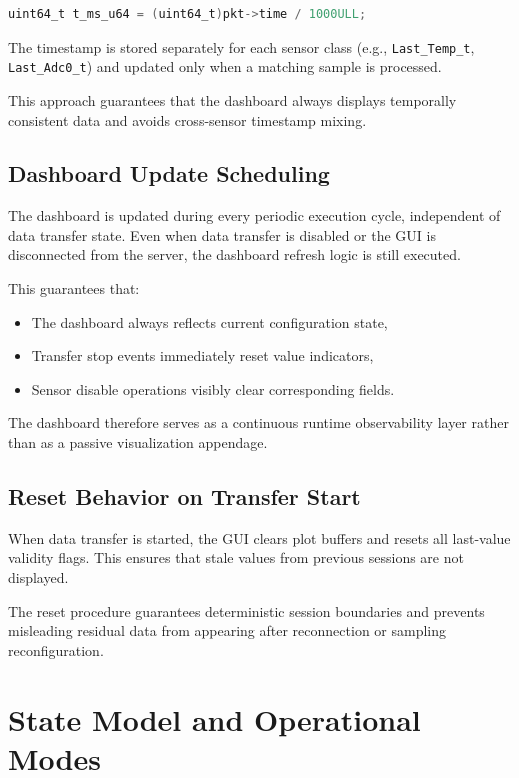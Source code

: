 \begin{lstlisting}[language=C]
	uint64_t t_ms_u64 = (uint64_t)pkt->time / 1000ULL;
\end{lstlisting}

The timestamp is stored separately for each sensor class (e.g., \texttt{Last\_Temp\_t}, \texttt{Last\_Adc0\_t}) and updated only when a matching sample is processed.

This approach guarantees that the dashboard always displays temporally consistent data and avoids cross-sensor timestamp mixing.

\subsection{Dashboard Update Scheduling}
\label{sec:gui_dashboard_scheduling}

The dashboard is updated during every periodic execution cycle, independent of data transfer state. Even when data transfer is disabled or the GUI is disconnected from the server, the dashboard refresh logic is still executed.

This guarantees that:

\begin{itemize}
	\item The dashboard always reflects current configuration state,
	\item Transfer stop events immediately reset value indicators,
	\item Sensor disable operations visibly clear corresponding fields.
\end{itemize}

The dashboard therefore serves as a continuous runtime observability layer rather than as a passive visualization appendage.

\subsection{Reset Behavior on Transfer Start}
\label{sec:gui_dashboard_reset}

When data transfer is started, the GUI clears plot buffers and resets all last-value validity flags. This ensures that stale values from previous sessions are not displayed.

The reset procedure guarantees deterministic session boundaries and prevents misleading residual data from appearing after reconnection or sampling reconfiguration.

\section{State Model and Operational Modes}
\label{sec:gui_state_model}

